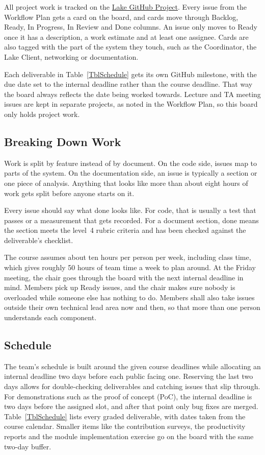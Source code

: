 \documentclass{article}
\begin{document}
All project work is tracked on the
\href{https://github.com/orgs/capstoneCEGJM/projects/1}{Lake GitHub Project}.
Every issue from the Workflow Plan gets a card on the board, and cards move
through Backlog, Ready, In Progress, In Review and Done columns. An issue only
moves to Ready once it has a description, a work estimate and at least
one assignee. Cards are also tagged with the part of the system they touch,
such as the Coordinator, the Lake Client, networking or documentation.

Each deliverable in Table~\ref{TblSchedule} gets its own GitHub milestone,
with the due date set to the internal deadline rather than the course
deadline. That way the board always reflects the date being worked
towards. Lecture and TA meeting issues are kept in separate projects, as noted
in the Workflow Plan, so this board only holds project work.

\subsection{Breaking Down Work}

Work is split by feature instead of by document. On the code side, issues map
to parts of the system. On the documentation side, an issue is typically a
section or one piece of analysis. Anything that looks like more than about
eight hours of work gets split before anyone starts on it. 

Every issue should say what done looks like. For code, that is usually a test
that passes or a measurement that gets recorded. For a document section, done
means the section meets the level~4 rubric criteria and has been checked
against the deliverable's checklist.

The course assumes about ten hours per person per week, including class time,
which gives roughly 50 hours of team time a week to plan around. At the Friday
meeting, the chair goes through the board with the next internal deadline in
mind. Members pick up Ready issues, and the chair makes sure nobody is
overloaded while someone else has nothing to do. Members shall also take
issues outside their own technical lead area now and then, so that more than
one person understands each component.

\subsection{Schedule}

The team's schedule is built around the given course deadlines while allocating an internal deadline two days before each public facing one. Reserving the last two days allows for double-checking deliverables and catching issues that slip through. For
demonstrations such as the proof of concept (PoC), the internal deadline is
two days before the assigned slot, and after that point only bug fixes are
merged. Table~\ref{TblSchedule} lists every graded deliverable, with dates
taken from the course calendar. Smaller items like the contribution surveys,
the productivity reports and the module implementation exercise go
on the board with the same two-day buffer.
\end{document}
